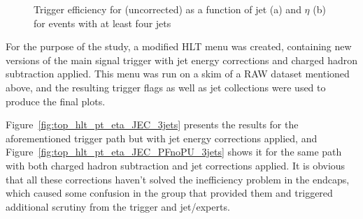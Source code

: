\begin{figure}[hbtp]
  \centering
  \hfill
  \caption[Trigger efficiency for \HLTThreeCentralPFJet as a function of jet \pt and $\eta$]{Trigger efficiency for
  \HLTThreeCentralPFJet (uncorrected) as a function of jet \pt (a) and $\eta$ (b) for events with at least four jets}
\label{fig:top_hlt_pt_eta_4jets} 
\end{figure}


For the purpose of the study, a modified HLT menu was created, containing new versions of the main signal trigger with
jet energy corrections and charged hadron subtraction applied. This menu was run on a \ttbar skim of a RAW dataset
mentioned above, and the resulting trigger flags as well as jet collections were used to produce the final plots.

Figure~\ref{fig:top_hlt_pt_eta_JEC_3jets} presents the results for the aforementioned trigger path but with jet energy
corrections applied, and Figure~\ref{fig:top_hlt_pt_eta_JEC_PFnoPU_3jets} shows it for the same path with both charged
hadron subtraction and jet corrections applied. It is obvious that all these corrections haven't solved the inefficiency
problem in the endcaps, which caused some confusion in the group that provided them and triggered additional scrutiny
from the trigger and jet/\MET experts.

